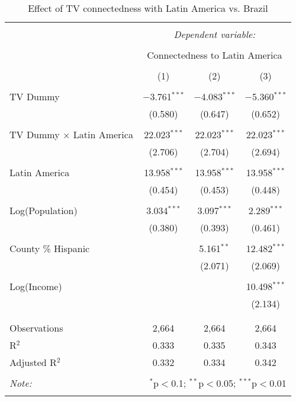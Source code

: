 
\begin{table}[!htbp] \centering 
  \caption{Effect of TV connectedness with Latin America vs. Brazil} 
  \label{} 
\begin{tabular}{@{\extracolsep{-5pt}}lccc} 
\\[-1.8ex]\hline 
\hline \\[-1.8ex] 
 & \multicolumn{3}{c}{\textit{Dependent variable:}} \\ 
\cline{2-4} 
\\[-1.8ex] & \multicolumn{3}{c}{Connectedness to Latin America} \\ 
\\[-1.8ex] & (1) & (2) & (3)\\ 
\hline \\[-1.8ex] 
 TV Dummy & $-$3.761$^{***}$ & $-$4.083$^{***}$ & $-$5.360$^{***}$ \\ 
  & (0.580) & (0.647) & (0.652) \\ 
  & & & \\ 
 TV Dummy $\times$ Latin America & 22.023$^{***}$ & 22.023$^{***}$ & 22.023$^{***}$ \\ 
  & (2.706) & (2.704) & (2.694) \\ 
  & & & \\ 
 Latin America & 13.958$^{***}$ & 13.958$^{***}$ & 13.958$^{***}$ \\ 
  & (0.454) & (0.453) & (0.448) \\ 
  & & & \\ 
 Log(Population) & 3.034$^{***}$ & 3.097$^{***}$ & 2.289$^{***}$ \\ 
  & (0.380) & (0.393) & (0.461) \\ 
  & & & \\ 
 County \% Hispanic &  & 5.161$^{**}$ & 12.482$^{***}$ \\ 
  &  & (2.071) & (2.069) \\ 
  & & & \\ 
 Log(Income) &  &  & 10.498$^{***}$ \\ 
  &  &  & (2.134) \\ 
  & & & \\ 
\hline \\[-1.8ex] 
Observations & 2,664 & 2,664 & 2,664 \\ 
R$^{2}$ & 0.333 & 0.335 & 0.343 \\ 
Adjusted R$^{2}$ & 0.332 & 0.334 & 0.342 \\ 
\hline 
\hline \\[-1.8ex] 
\textit{Note:}  & \multicolumn{3}{r}{$^{*}$p$<$0.1; $^{**}$p$<$0.05; $^{***}$p$<$0.01} \\ 
 & \multicolumn{3}{r}{} \\ 
\end{tabular} 
\end{table} 
